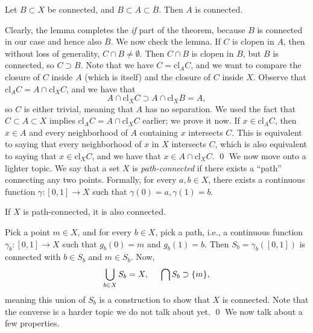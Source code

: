 \begin{simplelemma}
    Let $B \subset X$ be connected, and $B \subset A \subset \overline{B}$. Then $A$ is connected.
\end{simplelemma}
\noindent Clearly, the lemma completes the \textit{if} part of the theorem, because $B$ is connected in our case and hence also $\overline{B}$. We now check the lemma. If $C$ is clopen in $A$, then without loss of generality, $C \cap B \neq \emptyset$. Then $C \cap B$ is clopen in $B$, but $B$ is connected, so $C \supset B$. Note that we have $C = \mathrm{cl}_A C$, and we want to compare the closure of $C$ inside $A$ (which is itself) and the closure of $C$ inside $X$. Observe that $\mathrm{cl}_A C = A \cap \mathrm{cl}_X C$, and we have that
\[ A \cap \mathrm{cl}_X C \supset A \cap \mathrm{cl}_X B = A, \]
so $C$ is either trivial, meaning that $A$ has no separation.
\medskip\newline
\noindent We used the fact that $C \subset A \subset X$ implies $\mathrm{cl}_A C = A \cap \mathrm{cl}_X C$ earlier; we prove it now. If $x \in \mathrm{cl}_A C$, then $x \in A$ and every neighborhood of $A$ containing $x$ intersects $C$. This is equivalent to saying that every neighborhood of $x$ in $X$ intersects $C$, which is also equivalent to saying that $x \in \mathrm{cl}_X C$, and we have that $x \in A \cap \mathrm{cl}_X C$. \qed
\medskip\newline
\noindent We now move onto a lighter topic. We say that a set $X$ is \textit{path-connected} if there exists a ``path'' connecting any two points. Formally, for every $a, b \in X$, there exists a continuous function $\gamma : [0, 1] \to X$ such that $\gamma(0) = a, \gamma(1) = b$.
\begin{simplethm}
    If $X$ is path-connected, it is also connected.
\end{simplethm}
\noindent Pick a point $m \in X$, and for every $b \in X$, pick a path, i.e., a continuous function $\gamma_b : [0, 1] \to X$ such that $g_b(0) = m$ and $g_b(1) = b$. Then $S_b = \gamma_b([0, 1])$ is connected with $b \in S_b$ and $m \in S_b$. Now,
\[ \bigcup_{b \in X} S_b = X, \hspace{0.2in} \bigcap S_b \supset \{m\}, \]
meaning this union of $S_b$ is a construction to show that $X$ is connected. Note that the converse is a harder topic we do not talk about yet. \qed
\medskip\newline
We now talk about a few properties.
